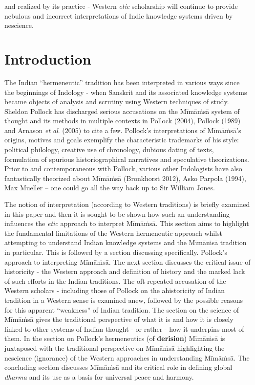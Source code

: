 and realized by its practice - Western \textit{etic} scholarship will continue to provide nebulous and incorrect interpretations of Indic knowledge systems driven by nescience.

\section*{Introduction}

The Indian “hermeneutic” tradition has been interpreted in various ways since the beginnings of Indology - when Sanskrit and its associated knowledge systems became objects of analysis and scrutiny using Western techniques of study. Sheldon Pollock has discharged serious accusations on the Mīmāṁsā system of thought and its methods in multiple contexts in Pollock (2004), Pollock (1989) and Arnason \textit{et al}. (2005) to cite a few. Pollock’s interpretations of Mīmāṁsā’s origins, motives and goals exemplify the characteristic trademarks of his style: political philology, creative use of chronology, dubious dating of texts, formulation of spurious historiographical narratives and speculative theorizations. Prior to and contemporaneous with Pollock, various other Indologists have also fantastically theorized about Mīmāṁsā (Bronkhorst 2012), Asko Parpola (1994), Max Mueller – one could go all the way back up to Sir William Jones.

The notion of interpretation (according to Western traditions) is briefly examined in this paper and then it is sought to be shown how such an understanding influences the \textit{etic} approach to interpret Mīmāṁsā. This section aims to highlight the fundamental limitations of the Western hermeneutic approach whilst attempting to understand Indian knowledge systems and the Mīmāṁsā tradition in particular. This is followed by a section discussing specifically. Pollock’s approach to interpreting Mīmāṁsā. The next section discusses the critical issue of historicity - the Western approach and definition of history and the marked lack of such efforts in the Indian traditions. The oft-repeated accusation of the Western scholars - including those of Pollock on the ahistoricity of Indian tradition in a Western sense is examined anew, followed by the possible reasons for this apparent “weakness” of Indian tradition. The section on the science of Mīmāṁsā gives the traditional perspective of what it is and how it is closely linked to other systems of Indian thought - or rather - how it underpins most of them. In the section on Pollock’s hermeneutics (of \textbf{derision}) Mīmāṁsā is juxtaposed with the traditional perspective on Mīmāṁsā highlighting the nescience (ignorance) of the Western approaches in understanding Mīmāṁsā. The concluding section discusses Mīmāṁsā and its critical role in defining global \textit{dharma} and its use as a basis for universal peace and harmony.

